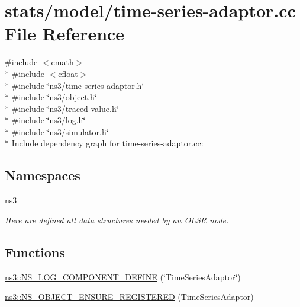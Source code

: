 \hypertarget{time-series-adaptor_8cc}{}\section{stats/model/time-\/series-\/adaptor.cc File Reference}
\label{time-series-adaptor_8cc}
{\ttfamily \#include $<$cmath$>$}\\*
{\ttfamily \#include $<$cfloat$>$}\\*
{\ttfamily \#include \char`\"{}ns3/time-\/series-\/adaptor.\+h\char`\"{}}\\*
{\ttfamily \#include \char`\"{}ns3/object.\+h\char`\"{}}\\*
{\ttfamily \#include \char`\"{}ns3/traced-\/value.\+h\char`\"{}}\\*
{\ttfamily \#include \char`\"{}ns3/log.\+h\char`\"{}}\\*
{\ttfamily \#include \char`\"{}ns3/simulator.\+h\char`\"{}}\\*
Include dependency graph for time-\/series-\/adaptor.cc\+:
\subsection*{Namespaces}
\begin{DoxyCompactItemize}
\item 
 \hyperlink{namespacens3}{ns3}
\begin{DoxyCompactList}\small\item\em Here are defined all data structures needed by an O\+L\+SR node. \end{DoxyCompactList}\end{DoxyCompactItemize}
\subsection*{Functions}
\begin{DoxyCompactItemize}
\item 
\hyperlink{namespacens3_a632e5692be800bd599ba1af9b49dfcf9}{ns3\+::\+N\+S\+\_\+\+L\+O\+G\+\_\+\+C\+O\+M\+P\+O\+N\+E\+N\+T\+\_\+\+D\+E\+F\+I\+NE} (\char`\"{}Time\+Series\+Adaptor\char`\"{})
\item 
\hyperlink{namespacens3_a288ffab5f0122e80d7e3b2ca4a07c2f6}{ns3\+::\+N\+S\+\_\+\+O\+B\+J\+E\+C\+T\+\_\+\+E\+N\+S\+U\+R\+E\+\_\+\+R\+E\+G\+I\+S\+T\+E\+R\+ED} (Time\+Series\+Adaptor)
\end{DoxyCompactItemize}
